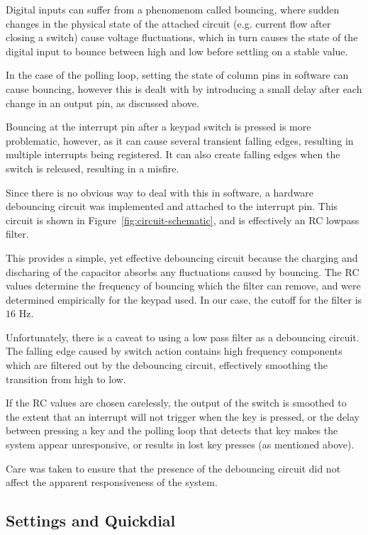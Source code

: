 \documentclass[11pt,a4paper,twocolumn]{scrartcl}
\begin{document}
Digital inputs can suffer from a phenomenom called bouncing, where sudden changes in the physical state of the attached circuit (e.g. current flow after closing a switch) cause voltage fluctuations, which in turn causes the state of the digital input to bounce between high and low before settling on a stable value. 

In the case of the polling loop, setting the state of column pins in software can cause bouncing, however this is dealt with by introducing a small delay after each change in an output pin, as discussed above.

Bouncing at the interrupt pin after a keypad switch is pressed is more problematic, however, as it can cause several transient falling edges, resulting in multiple interrupts being registered. It can also create falling edges when the switch is released, resulting in a misfire. 

Since there is no obvious way to deal with this in software, a hardware debouncing circuit was implemented and attached to the interrupt pin. This circuit is shown in Figure~\ref{fig:circuit-schematic}, and is effectively an RC lowpass filter.

This provides a simple, yet effective debouncing circuit because the charging and discharing of the capacitor absorbs any fluctuations caused by bouncing\cite{Li_2021}. The RC values determine the frequency of bouncing which the filter can remove, and were determined empirically for the keypad used. In our case, the cutoff for the filter is $16$ Hz.

Unfortunately, there is a caveat to using a low pass filter as a debouncing circuit. The falling edge caused by switch action contains high frequency components which are filtered out by the debouncing circuit, effectively smoothing the transition from high to low. 

If the RC values are chosen carelessly, the output of the switch is smoothed to the extent that an interrupt will not trigger when the key is pressed, or the delay between pressing a key and the polling loop that detects that key makes the system appear unresponsive, or results in lost key presses (as mentioned above). 

Care was taken to ensure that the presence of the debouncing circuit did not affect the apparent responsiveness of the system.

\subsection{Settings and Quickdial} \label{settings-quickdial}
\end{document}
